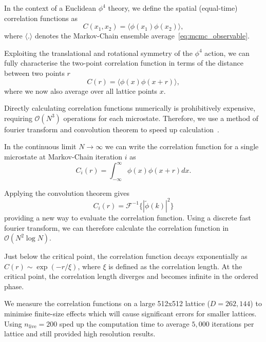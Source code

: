 \documentclass[11pt]{article}
\begin{document}
    In the context of a Euclidean $\phi^4$ theory, we define the spatial (equal-time) correlation functions as
    \begin{equation}\label{eq:full_correlation_function}
    C(x_1, x_2) = \langle \phi(x_1) \phi(x_2) \rangle,
    \end{equation}
    where $\langle . \rangle$ denotes the Markov-Chain ensemble average~\eqref{eq:mcmc_observable}.

    Exploiting the translational and rotational symmetry of the $\phi^4$ action, we can fully characterise the two-point
    correlation function in terms of the distance between two points $r$
    \begin{equation}\label{eq:correlation_function}
    C(r) = \langle \phi(x) \phi(x + r) \rangle,
    \end{equation}
    where we now also average over all lattice points $x$.

    Directly calculating correlation functions numerically is prohibitively expensive, requiring $\mathcal{O}(N^3)$
    operations for each microstate.
    Therefore, we use a method of fourier transform and convolution theorem to speed up
    calculation~\cite{Ruge_1994}.

    In the continuous limit $N \rightarrow \infty$ we can write the correlation function for a single microstate at
    Markov-Chain iteration $i$ as
    \begin{equation}\label{eq:continuous_correlation}
        C_{i}(r) = \int_{-\infty}^{\infty} \phi(x) \phi(x + r) dx.
    \end{equation}

    Applying the convolution theorem gives
    \begin{equation}\label{eq:convolution_theorem}
        C_{i}(r) = \mathcal{F}^{-1} \{ |\tilde{\phi}(k)|^2 \}
    \end{equation}
    providing a new way to evaluate the correlation function.
    Using a discrete fast fourier transform, we can therefore calculate the correlation function in
    $\mathcal{O}(N^2 \log N)$.

    Just below the critical point, the correlation function decays exponentially as $C(r) \sim \exp(-r / \xi)$,
    where $\xi$ is defined as the correlation length.
    At the critical point, the correlation length diverges and becomes infinite in the ordered phase.

    We measure the correlation functions on a large 512x512 lattice ($D=262,144$) to minimise finite-size effects which
    will cause significant errors for smaller lattices.
    Using $n_{\text{live}}=200$ sped up the computation time to average $5,000$ iterations per lattice and still
    provided high resolution results.
\end{document}
